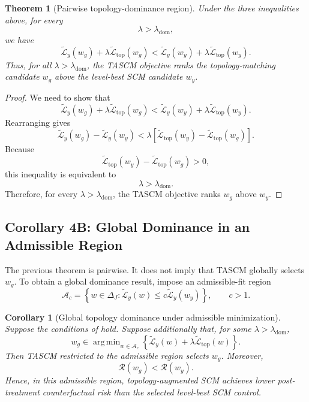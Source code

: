\documentclass[11pt]{article}
\theoremstyle{plain}
\newtheorem{theorem}{Theorem}[section]
\newtheorem{corollary}[corollary]{Corollary}
\theoremstyle{definition}
\theoremstyle{remark}
\DeclareMathOperator*{\argmin}{arg\,min}
\newcommand{\1}{\mathbbm{1}}
\begin{document}
\begin{theorem}[Pairwise topology-dominance region]
\label{thm:pairwise-dominance}
Under the three inequalities above, for every
\[
\lambda>\lambda_{\mathrm{dom}},
\]
we have
\[
\widetilde{\mathcal L}_y(w_g)
+
\lambda\widetilde{\mathcal L}_{\mathrm{top}}(w_g)
<
\widetilde{\mathcal L}_y(w_y)
+
\lambda\widetilde{\mathcal L}_{\mathrm{top}}(w_y).
\]
Thus, for all \(\lambda>\lambda_{\mathrm{dom}}\), the TASCM objective ranks the
topology-matching candidate \(w_g\) above the level-best SCM candidate \(w_y\).
\end{theorem}

\begin{proof}
We need to show that
\[
\widetilde{\mathcal L}_y(w_g)
+
\lambda\widetilde{\mathcal L}_{\mathrm{top}}(w_g)
<
\widetilde{\mathcal L}_y(w_y)
+
\lambda\widetilde{\mathcal L}_{\mathrm{top}}(w_y).
\]
Rearranging gives
\[
\widetilde{\mathcal L}_y(w_g)
-
\widetilde{\mathcal L}_y(w_y)
<
\lambda
\left[
\widetilde{\mathcal L}_{\mathrm{top}}(w_y)
-
\widetilde{\mathcal L}_{\mathrm{top}}(w_g)
\right].
\]
Because
\[
\widetilde{\mathcal L}_{\mathrm{top}}(w_y)
-
\widetilde{\mathcal L}_{\mathrm{top}}(w_g)
>0,
\]
this inequality is equivalent to
\[
\lambda>\lambda_{\mathrm{dom}}.
\]
Therefore, for every \(\lambda>\lambda_{\mathrm{dom}}\), the TASCM objective
ranks \(w_g\) above \(w_y\).
\end{proof}

\subsection{Corollary 4B: Global Dominance in an Admissible Region}

The previous theorem is pairwise. It does not imply that TASCM globally selects
\(w_g\). To obtain a global dominance result, impose an admissible-fit region
\[
\mathcal A_c
=
\left\{
w\in\Delta_J:
\widetilde{\mathcal L}_y(w)
\le
c\widetilde{\mathcal L}_y(w_y)
\right\},
\qquad c>1.
\]

\begin{corollary}[Global topology dominance under admissible minimization]
\label{cor:global-dominance}
Suppose the conditions of  hold. Suppose
additionally that, for some \(\lambda>\lambda_{\mathrm{dom}}\),
\[
w_g
\in
\argmin_{w\in\mathcal A_c}
\left\{
\widetilde{\mathcal L}_y(w)
+
\lambda\widetilde{\mathcal L}_{\mathrm{top}}(w)
\right\}.
\]
Then TASCM restricted to the admissible region selects \(w_g\). Moreover,
\[
\mathcal R(w_g)<\mathcal R(w_y).
\]
Hence, in this admissible region, topology-augmented SCM achieves lower
post-treatment counterfactual risk than the selected level-best SCM control.
\end{corollary}
\end{document}

